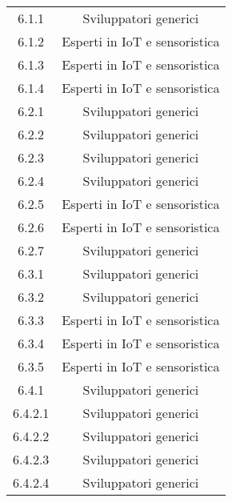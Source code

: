 \begin{table}[h]
\begin{tabular}{|c|c|}
        6.1.1             & Sviluppatori generici                                    \\
        6.1.2             & Esperti in IoT e sensoristica                            \\
        6.1.3             & Esperti in IoT e sensoristica                            \\
        6.1.4             & Esperti in IoT e sensoristica                            \\
        6.2.1             & Sviluppatori generici                                    \\
        6.2.2             & Sviluppatori generici                                    \\
        6.2.3             & Sviluppatori generici                                    \\
        6.2.4             & Sviluppatori generici                                    \\
        6.2.5             & Esperti in IoT e sensoristica                            \\
        6.2.6             & Esperti in IoT e sensoristica                            \\
        6.2.7             & Sviluppatori generici                                    \\
        6.3.1             & Sviluppatori generici                                    \\
        6.3.2             & Sviluppatori generici                                    \\
        6.3.3             & Esperti in IoT e sensoristica                            \\
        6.3.4             & Esperti in IoT e sensoristica                            \\
        6.3.5             & Esperti in IoT e sensoristica                            \\
        6.4.1             & Sviluppatori generici                                    \\
        6.4.2.1           & Sviluppatori generici                                    \\
        6.4.2.2           & Sviluppatori generici                                    \\
        6.4.2.3           & Sviluppatori generici                                    \\
        6.4.2.4           & Sviluppatori generici                                    \\

\end{tabular}
\end{table}
